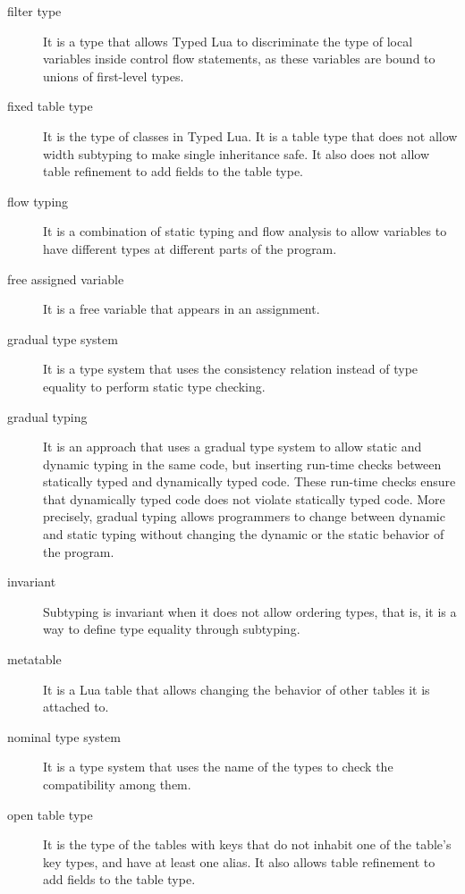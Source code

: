 \begin{description}
\item[filter type] It is a type that allows Typed Lua to discriminate the type of local variables
inside control flow statements, as these variables are bound to unions of
first-level types.

\item[fixed table type] It is the type of classes in Typed Lua.
It is a table type that does not allow width subtyping to make single
inheritance safe.
It also does not allow table refinement to add fields to the table type. 

\item[flow typing] It is a combination of static typing and flow analysis to allow variables
to have different types at different parts of the program.

\item[free assigned variable] It is a free variable that appears in an assignment.

\item[gradual type system] It is a type system that uses the consistency relation instead of type equality
to perform static type checking.

\item[gradual typing] It is an approach that uses a gradual type system to allow static and dynamic
typing in the same code, but inserting run-time checks between statically
typed and dynamically typed code.
These run-time checks ensure that dynamically typed code does not violate
statically typed code.
More precisely, gradual typing allows programmers to change between
dynamic and static typing without changing the dynamic or the static behavior
of the program.

\item[invariant] Subtyping is invariant when it does not allow ordering types, that is,
it is a way to define type equality through subtyping.

\item[metatable] It is a Lua table that allows changing the behavior of other tables
it is attached to.

\item[nominal type system] It is a type system that uses the name of the types to check the
compatibility among them.

\item[open table type] It is the type of the tables with keys that do not inhabit one of
the table's key types, and have at least one alias.
It also allows table refinement to add fields to the table type. 


\end{description}
